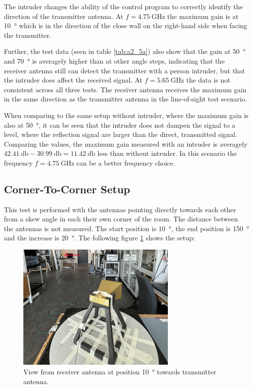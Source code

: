 The intruder changes the ability of the control program to correctly identify the direction of the transmitter antenna. At $f=\SI{4.75}{\giga\hertz}$ the maximum gain is at \SI{10}{\degree} which is in the direction of the close wall on the right-hand side when facing the transmitter. 

Further, the test data (seen in table \ref{tab:a2_5a}) also show that the gain at \SI{50}{\degree} and \SI{70}{\degree} is averagely higher than at other angle steps, indicating that the receiver antenna still can detect the transmitter with a person intruder, but that the intruder does affect the received signal. At $f=\SI{5.65}{\giga\hertz}$ the data is not consistent across all three tests. The receiver antenna receives the maximum gain in the same direction as the transmitter antenna in the line-of-sight test scenario. 

When comparing to the same setup without intruder, where the maximum gain is also at \SI{50}{\degree}, it can be seen that the intruder does not dampen the signal to a level, where the reflection signal are larger than the direct, transmitted signal. Comparing the values, the maximum gain measured with an intruder is averagely $\SI{42.41}{\decibel}-\SI{30.99}{\decibel}=\SI{11.42}{\decibel}$ less than without intruder. In this scenario the frequency $f=\SI{4.75}{\giga\hertz}$ can be a better frequency choice.

\subsection{Corner-To-Corner Setup}
This test is performed with the antennas pointing directly towards each other from a skew angle in each their own corner of the room. The distance between the antennas is not measured. The start position is \SI{10}{\degree}, the end position is \SI{150}{\degree} and the increase is \SI{20}{\degree}. The following figure \ref{fig:a2_2} shows the setup:
\begin{figure}[H]
    \centering
    \includegraphics[width=0.7\textwidth]{figures/test_los_corner.JPG}
    \caption{View from receiver antenna at position \SI{10}{\degree} towards transmitter antenna.} \label{fig:a2_2}
\end{figure}

